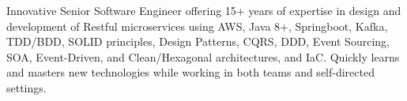 

\begin{cvparagraph}

Innovative Senior Software Engineer offering 15+ years of expertise in design and development of Restful microservices using AWS, Java 8+, Springboot, Kafka, TDD/BDD, SOLID principles, Design Patterns, CQRS, DDD, Event Sourcing, SOA, Event-Driven, and Clean/Hexagonal architectures, and IaC. Quickly learns and masters new technologies while working in both teams and self-directed settings.
\end{cvparagraph}
